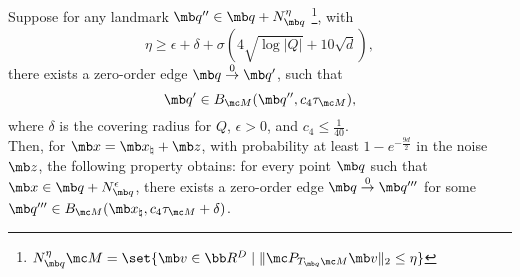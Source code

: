 {

\begin{lemma}\label{lem:existence of good ZOE}
    Suppose for any landmark $\mb q'' \in \mb q + N_{\mb q}^{\eta}$ \footnote{$N^{\eta}_{\mb q} \mc M = \set{ \mb v \in \bb R^D \mid \| \mc P_{T_{\mb q}\mc M} \mb v \|_2 \le \eta}$},  with 
    \begin{equation}
    \eta \geq  \epsilon + \delta + \sigma\left(4\sqrt{\log|Q|}+10\sqrt{d}\right),     
    \end{equation}
    there exists a zero-order edge $\mb q \overset{0}{\rightarrow} \mb q'$, such that
    \begin{equation}
        \mb q' \in B_{\mc M}(\mb q'', c_4 \tau_{\mc M}),
    \end{equation}
    where $\delta$ is the covering radius for $Q$, $\epsilon> 0$, 
    and $c_4 \le \tfrac{1}{40}$. \\
    Then, for $\mb x = \mb x_\natural + \mb z$, with probability at least $1 - e^{-\frac{9d}{2}}$ in the noise $\mb z$, the following property obtains: for every point $\mb q$ such that $\mb x \in \mb q + N^{\epsilon}_{\mb q}$, there exists a zero-order edge $\mb q \overset{0}{\rightarrow} \mb q'''$ for some $\mb q''' \in B_{\mc M}(\mb x_\natural, c_4 \tau_{\mc M} + \delta)$.
\end{lemma}




}
